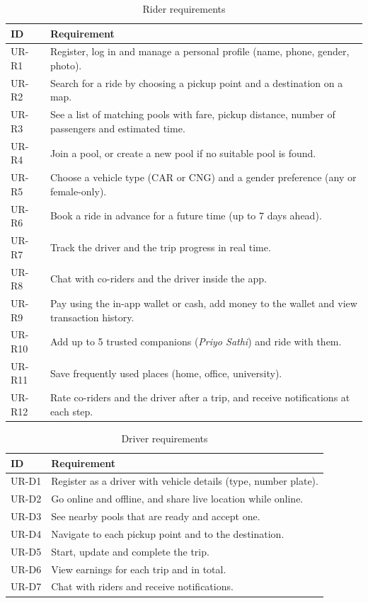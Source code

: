 \begin{table}[H]
  \centering
  \small
  \caption{Rider requirements}
  \label{tab:rider-req}
  \begin{tabularx}{\textwidth}{@{}lL@{}}
    \toprule
    \textbf{ID} & \textbf{Requirement} \\
    \midrule
    UR-R1  & Register, log in and manage a personal profile (name, phone, gender, photo). \\
    UR-R2  & Search for a ride by choosing a pickup point and a destination on a map. \\
    UR-R3  & See a list of matching pools with fare, pickup distance, number of passengers and estimated time. \\
    UR-R4  & Join a pool, or create a new pool if no suitable pool is found. \\
    UR-R5  & Choose a vehicle type (CAR or CNG) and a gender preference (any or female-only). \\
    UR-R6  & Book a ride in advance for a future time (up to 7 days ahead). \\
    UR-R7  & Track the driver and the trip progress in real time. \\
    UR-R8  & Chat with co-riders and the driver inside the app. \\
    UR-R9  & Pay using the in-app wallet or cash, add money to the wallet and view transaction history. \\
    UR-R10 & Add up to 5 trusted companions (\textit{Priyo Sathi}) and ride with them. \\
    UR-R11 & Save frequently used places (home, office, university). \\
    UR-R12 & Rate co-riders and the driver after a trip, and receive notifications at each step. \\
    \bottomrule
  \end{tabularx}
\end{table}

\begin{table}[H]
  \centering
  \small
  \caption{Driver requirements}
  \label{tab:driver-req}
  \begin{tabularx}{\textwidth}{@{}lL@{}}
    \toprule
    \textbf{ID} & \textbf{Requirement} \\
    \midrule
    UR-D1 & Register as a driver with vehicle details (type, number plate). \\
    UR-D2 & Go online and offline, and share live location while online. \\
    UR-D3 & See nearby pools that are ready and accept one. \\
    UR-D4 & Navigate to each pickup point and to the destination. \\
    UR-D5 & Start, update and complete the trip. \\
    UR-D6 & View earnings for each trip and in total. \\
    UR-D7 & Chat with riders and receive notifications. \\
    \bottomrule
  \end{tabularx}
\end{table}

